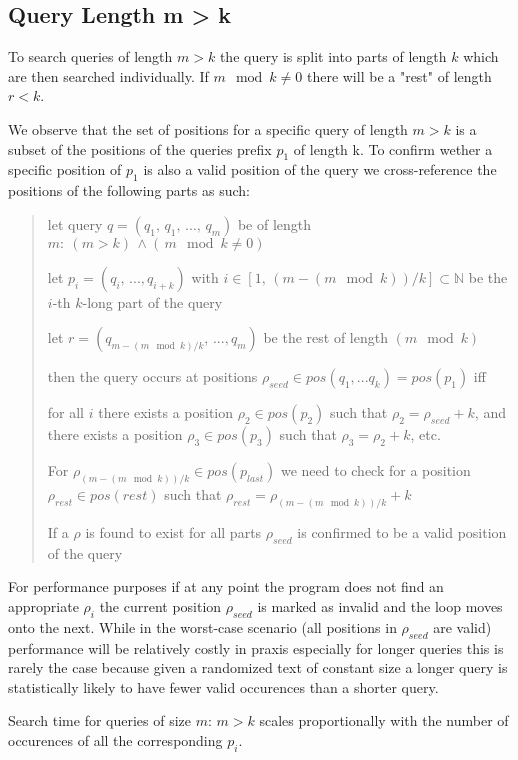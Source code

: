\subsection{Query Length m > k}

To search queries of length $m>k$ the query is split into parts of length $k$ which are then searched individually.
If $m\mod k\neq0$ there will be a "rest" of length $r<k$.

We observe that the set of positions for a specific query of length $m>k$ is a subset of the positions of the queries
prefix $p_{1}$ of length k. To confirm wether a specific position of $p_{1}$ is also a valid position of the query we
cross-reference the positions of the following parts as such:

\begin{verse}
let query $q=(q_{1},\,q_{1},\,...,\,q_{m})$ be of length $m:\:(m>k)\,\land(\,m\mod k\neq\text{0})$

let $p_{i}=(q_{i},\,...,q_{i+k})$ with $i\in[1,\,(m-(m\mod k))/k]\subset\mathbb{N}$
be the $i$-th $k$-long part of the query

let $r=(q_{m-(m\mod k)/k},\,...,q_{m})$ be the rest of length $(m\mod k)$

then the query occurs at positions $\rho_{seed}\in pos(q_{1},...q_{k})=pos(p_{1})$
iff

for all $i$ there exists a position $\rho_{2}\in pos(p_{2})$ such
that $\rho_{2}=\rho_{seed}+k$, and there exists a position $\rho_{3}\in pos(p_{3})$
such that $\rho_{3}=\rho_{2}+k$, etc.

For $\rho_{(m-(m\mod k))/k}\in pos(p_{last})$ we need to check for
a position $\rho_{rest}\in pos(rest)$ such that $\rho_{rest}=\rho_{(m-(m\mod k))/k}+k$

If a $\rho$ is found to exist for all parts $\rho_{seed}$ is confirmed to be a valid position of the query
\end{verse}

For performance purposes if at any point the program does not find an appropriate $\rho_{i}$ the current position
$\rho_{seed}$ is marked as invalid and the loop moves onto the next. While in the worst-case scenario (all positions
in $\rho_{seed}$ are valid) performance will be relatively costly in praxis especially for longer queries this is rarely the case
because given a randomized text of constant size a longer query is statistically likely to have fewer valid
occurences than a shorter query.

\begin{lem}
\label{Lemma 3}Search time for queries of size $m:\,m>k$ scales
proportionally with the number of occurences of all the corresponding $p_{i}$.
\end{lem}

